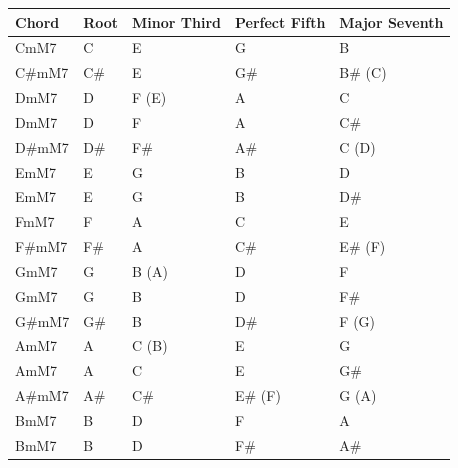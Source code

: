\documentclass{article}
\begin{document}
\begin{tabular}{lllll}
\toprule
Chord & Root & Minor Third & Perfect Fifth & Major Seventh \\
\midrule
CmM7 & C & E & G & B \\
C\#mM7 & C\# & E & G\# & B\# (C) \\
DmM7 & D & F (E) & A & C \\
DmM7 & D & F & A & C\# \\
D\#mM7 & D\# & F\# & A\# & C (D) \\
EmM7 & E & G & B & D \\
EmM7 & E & G & B & D\# \\
FmM7 & F & A & C & E \\
F\#mM7 & F\# & A & C\# & E\# (F) \\
GmM7 & G & B (A) & D & F \\
GmM7 & G & B & D & F\# \\
G\#mM7 & G\# & B & D\# & F (G) \\
AmM7 & A & C (B) & E & G \\
AmM7 & A & C & E & G\# \\
A\#mM7 & A\# & C\# & E\# (F) & G (A) \\
BmM7 & B & D & F & A \\
BmM7 & B & D & F\# & A\# \\
\bottomrule
\end{tabular}
\end{document}
